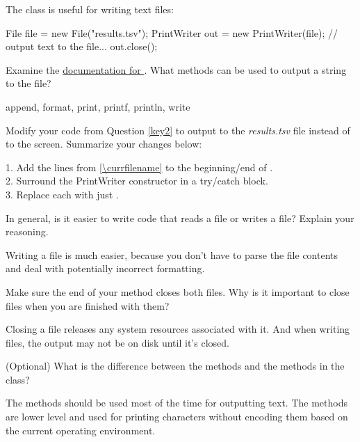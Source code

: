
The  class is useful for writing text files:

\medskip

\begin{javalst}
File file = new File("results.tsv");
PrintWriter out = new PrintWriter(file);
// output text to the file...
out.close();
\end{javalst}




\Q Examine the \href{https://docs.oracle.com/en/java/javase/11/docs/api/java.base/java/io/PrintWriter.html}{documentation for }.
What methods can be used to output a string to the file?

\begin{answer}[3em]
append, format, print, printf, println, write
\end{answer}


\Q \label{key3}
Modify your code from Question \ref{key2} to output to the \textit{results.tsv} file instead of to the screen.
Summarize your changes below:

\begin{answer}[6em]
1. Add the lines from \ref{\currfilename} to the beginning/end of . \\
2. Surround the PrintWriter constructor in a try/catch block. \\
3. Replace each  with just .
\end{answer}


\Q In general, is it easier to write code that reads a file or writes a file?
Explain your reasoning.

\begin{answer}
Writing a file is much easier, because you don't have to parse the file contents and deal with potentially incorrect formatting.
\end{answer}



\Q Make sure the end of your  method closes both files.
Why is it important to close files when you are finished with them?

\begin{answer}
Closing a file releases any system resources associated with it.
And when writing files, the output may not be on disk until it's closed.
\end{answer}


\Q (Optional) What is the difference between the  methods and the  methods in the  class?

\begin{answer}
The  methods should be used most of the time for outputting text.
The  methods are lower level and used for printing characters without encoding them based on the current operating environment.
\end{answer}
